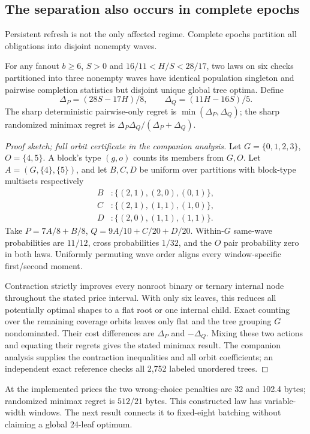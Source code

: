 \subsection{The separation also occurs in complete epochs}
Persistent refresh is not the only affected regime. Complete epochs
partition all obligations into disjoint nonempty waves.
\begin{theorem}\label{thm:strict-pairwise}
For any fanout $b\ge6$, $S>0$ and $16/11<H/S<28/17$, two laws on six
checks partitioned into three nonempty waves have identical population
singleton and pairwise completion statistics but disjoint unique global
tree optima. Define
\[
 \Delta_P=(28S-17H)/8,\qquad \Delta_Q=(11H-16S)/5.
\]
The sharp deterministic pairwise-only regret is
$\min(\Delta_P,\Delta_Q)$; the sharp randomized minimax regret is
$\Delta_P\Delta_Q/(\Delta_P+\Delta_Q)$.
\end{theorem}
\begin{proof}[Proof sketch; full orbit certificate in the companion analysis]
Let $G=\{0,1,2,3\}$, $O=\{4,5\}$. A block's type $(g,o)$ counts its
members from $G,O$. Let $A=(G,\{4\},\{5\})$, and let $B,C,D$ be uniform
over partitions with block-type multisets respectively
\begin{align*}
 B&:\{(2,1),(2,0),(0,1)\},\\
 C&:\{(2,1),(1,1),(1,0)\},\\
 D&:\{(2,0),(1,1),(1,1)\}.
\end{align*}
Take $P=7A/8+B/8$, $Q=9A/10+C/20+D/20$.
Within-$G$ same-wave probabilities are $11/12$, cross probabilities
$1/32$, and the $O$ pair probability zero in both laws. Uniformly
permuting wave order aligns every window-specific first/second moment.

Contraction strictly improves every nonroot binary or ternary internal
node throughout the stated price interval. With only six leaves, this
reduces all potentially optimal shapes to a flat root or one internal
child. Exact counting over the remaining coverage orbits leaves only
flat and the tree grouping $G$ nondominated. Their cost differences are
$\Delta_P$ and $-\Delta_Q$. Mixing these two actions and equating their
regrets gives the stated minimax result. The companion analysis supplies
the contraction inequalities and all orbit coefficients; an independent
exact reference checks all 2,752 labeled unordered trees.
\end{proof}
At the implemented prices the two wrong-choice penalties are 32 and
102.4 bytes; randomized minimax regret is $512/21$ bytes. This constructed
law has variable-width windows. The next result connects it to fixed-eight
batching without claiming a global 24-leaf optimum.
